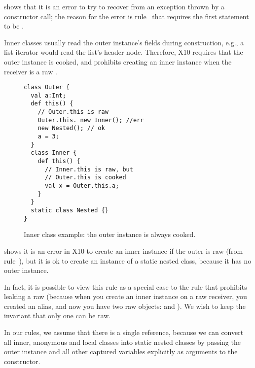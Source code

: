  shows that it is an error to try to recover from an exception thrown
    by a constructor call;
    the reason for the error is rule~ that requires the first statement to be .


Inner classes usually read the outer instance's fields during construction,
    e.g., a list iterator would read the list's header node.
Therefore, X10 requires that the outer instance is cooked,
    and prohibits creating an inner instance when the receiver is a raw \this.


\begin{figure}
\vspace{-0.2cm}\begin{lstlisting}
class Outer {
  val a:Int;
  def this() {
    // Outer.this is raw
    Outer.this. new Inner(); //err
    new Nested(); // ok
    a = 3;
  }
  class Inner {
    def this() {
      // Inner.this is raw, but
      // Outer.this is cooked
      val x = Outer.this.a;
    }
  }
  static class Nested {}
}
\end{lstlisting}\vspace{-0.2cm}
\caption{Inner class example: the outer instance is always cooked.
    }
\label{Figure:InnerClass}
\end{figure}

 shows it is an error in X10 to create an inner instance
    if the outer is raw (from rule~),
    but it is ok to create an instance of a static nested class,
    because it has no outer instance.

In fact, it is possible to view this rule as a special case to the rule that
    prohibits leaking a raw \this
    (because when you create an inner instance on a raw \this receiver,
    you created an alias,
    and now you have two raw objects:  and ).
We wish to keep the invariant that only one \this can be raw.

In our rules, we assume that there is a single \this reference,
    because we can convert all inner, anonymous and local classes into
    static nested classes
    by passing the outer instance and all other captured variables
    explicitly as arguments to the constructor.






